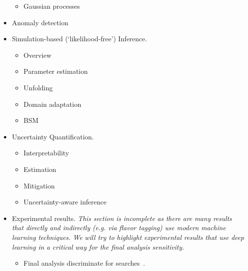 \documentclass[12pt,letterpaper]{article}
\begin{document}
\begin{itemize}
\begin{itemize}
		\item Gaussian processes~\cite{Frate:2017mai,Bertone:2016mdy,1804325}
	\end{itemize}
\item Anomaly detection~\cite{DAgnolo:2018cun,Collins:2018epr,Collins:2019jip,DAgnolo:2019vbw,Farina:2018fyg,Heimel:2018mkt,Roy:2019jae,Cerri:2018anq,Blance:2019ibf,Hajer:2018kqm,DeSimone:2018efk,Mullin:2019mmh,1809.02977,Dillon:2019cqt,Andreassen:2020nkr,Nachman:2020lpy,Aguilar-Saavedra:2017rzt,Romao:2019dvs,Romao:2020ojy,knapp2020adversarially,collaboration2020dijet,1797846,1800445,Amram:2020ykb,Cheng:2020dal,Khosa:2020qrz,Thaprasop:2020mzp,Alexander:2020mbx,aguilarsaavedra2020mass}
\item Simulation-based (`likelihood-free') Inference.
	\begin{itemize}
		\item Overview~\cite{Cranmer:2019eaq}
		\item Parameter estimation~\cite{Andreassen:2019nnm,Stoye:2018ovl,Hollingsworth:2020kjg,Brehmer:2018kdj,Brehmer:2018eca,Brehmer:2019xox,Brehmer:2018hga,Cranmer:2015bka}
		\item Unfolding~\cite{Andreassen:2019cjw,Datta:2018mwd,Bellagente:2019uyp,Gagunashvili:2010zw,Glazov:2017vni,Martschei:2012pr,Lindemann:1995ut,Zech2003BinningFreeUB,1800956}
		\item Domain adaptation~\cite{Rogozhnikov:2016bdp,Andreassen:2019nnm,Cranmer:2015bka}
		\item BSM~\cite{Andreassen:2020nkr,Hollingsworth:2020kjg,Brehmer:2018kdj,Brehmer:2018eca,Brehmer:2018hga,Brehmer:2019xox,Romao:2020ojy}
	\end{itemize}
\item Uncertainty Quantification.
	\begin{itemize}
		\item Interpretability~\cite{deOliveira:2015xxd,Chang:2017kvc,Diefenbacher:2019ezd}
		\item Estimation~\cite{Nachman:2019dol,Nachman:2019yfl,Barnard:2016qma}
		\item Mitigation~\cite{Estrade:DLPS2017,Englert:2018cfo,Louppe:2016ylz}
		\item Uncertainty-aware inference~\cite{Caron:2019xkx,Bollweg:2019skg,deCastro:2018mgh,Wunsch:2020iuh}
	\end{itemize}
\item Experimental results. \textit{This section is incomplete as there are many results that directly and indirectly (e.g. via flavor tagging) use modern machine learning techniques.  We will try to highlight experimental results that use deep learning in a critical way for the final analysis sensitivity.}
	\begin{itemize}
		\item Final analysis discriminate for searches~\cite{Aad:2019yxi,Aad:2020hzm,collaboration2020dijet,Sirunyan:2020hwz}.
	\end{itemize}


\end{itemize}


\clearpage
\flushbottom
%


\end{document}
